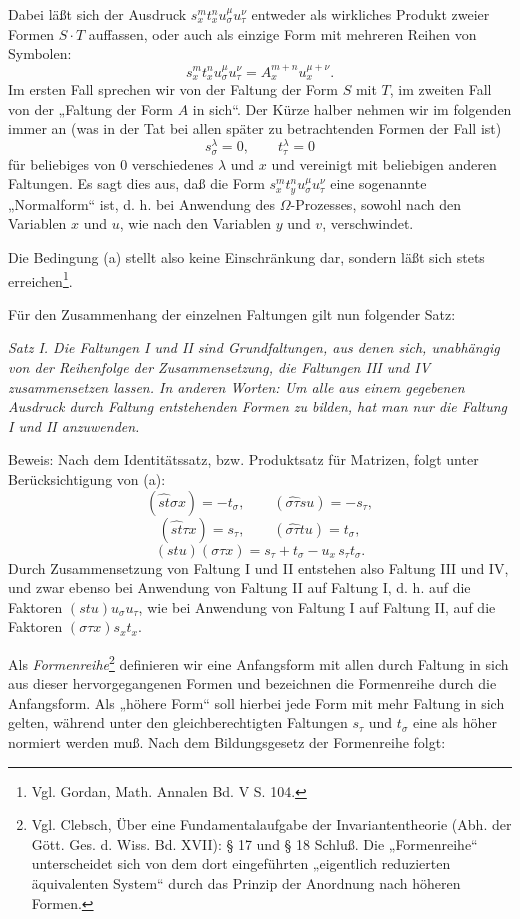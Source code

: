 \documentclass[11pt]{article}
\begin{document}
Dabei läßt sich der Ausdruck $s_x^m t_x^n u_\sigma^\mu u_\tau^\nu$ entweder als wirkliches Produkt zweier Formen $S\cdot T$ auffassen, oder auch als einzige Form mit mehreren Reihen von Symbolen:
\[
s_x^m t_x^n u_\sigma^\mu u_\tau^\nu=A_x^{m+n}u_x^{\mu+\nu}.
\]
Im ersten Fall sprechen wir von der Faltung der Form $S$ mit $T$, im zweiten Fall von der „Faltung der Form $A$ in sich“. Der Kürze halber nehmen wir im folgenden immer an (was in der Tat bei allen später zu betrachtenden Formen der Fall ist)
\[
\tag{a}
s_\sigma^\lambda=0,\qquad t_\tau^\lambda=0
\]
für beliebiges von 0 verschiedenes $\lambda$ und $x$ und vereinigt mit beliebigen anderen Faltungen. Es sagt dies aus, daß die Form $s_x^m t_y^n u_\sigma^\mu u_\tau^\nu$ eine sogenannte „Normalform“ ist, d. h. bei Anwendung des $\Omega$-Prozesses, sowohl nach den Variablen $x$ und $u$, wie nach den Variablen $y$ und $v$, verschwindet.

Die Bedingung (a) stellt also keine Einschränkung dar, sondern läßt sich stets erreichen\footnote{Vgl. Gordan, Math. Annalen Bd. V S. 104.}.

Für den Zusammenhang der einzelnen Faltungen gilt nun folgender Satz:

\emph{Satz I. Die Faltungen I und II sind Grundfaltungen, aus denen sich, unabhängig von der Reihenfolge der Zusammensetzung, die Faltungen III und IV zusammensetzen lassen. In anderen Worten: Um alle aus einem gegebenen Ausdruck durch Faltung entstehenden Formen zu bilden, hat man nur die Faltung I und II anzuwenden.}

Beweis: Nach dem Identitätssatz, bzw. Produktsatz für Matrizen, folgt unter Berücksichtigung von (a):
\[
(\widehat{st}\sigma x)=-t_\sigma,\qquad
(\widehat{\sigma\tau}su)=-s_\tau,
\]
\[
(\widehat{st}\tau x)=s_\tau,\qquad
(\widehat{\sigma\tau}tu)=t_\sigma,
\]
\[
(stu)(\sigma\tau x)=s_\tau+t_\sigma-u_x\,s_\tau t_\sigma .
\]
Durch Zusammensetzung von Faltung I und II entstehen also Faltung III und IV, und zwar ebenso bei Anwendung von Faltung II auf Faltung I, d. h. auf die Faktoren $(stu)u_\sigma u_\tau$, wie bei Anwendung von Faltung I auf Faltung II, auf die Faktoren $(\sigma\tau x)s_xt_x$.

Als \emph{Formenreihe}\footnote{Vgl. Clebsch, Über eine Fundamentalaufgabe der Invariantentheorie (Abh. der Gött. Ges. d. Wiss. Bd. XVII): § 17 und § 18 Schluß. Die „Formenreihe“ unterscheidet sich von dem dort eingeführten „eigentlich reduzierten äquivalenten System“ durch das Prinzip der Anordnung nach höheren Formen.} definieren wir eine Anfangsform mit allen durch Faltung in sich aus dieser hervorgegangenen Formen und bezeichnen die Formenreihe durch die Anfangsform. Als „höhere Form“ soll hierbei jede Form mit mehr Faltung in sich gelten, während unter den gleichberechtigten Faltungen $s_\tau$ und $t_\sigma$ eine als höher normiert werden muß. Nach dem Bildungsgesetz der Formenreihe folgt:
\end{document}
